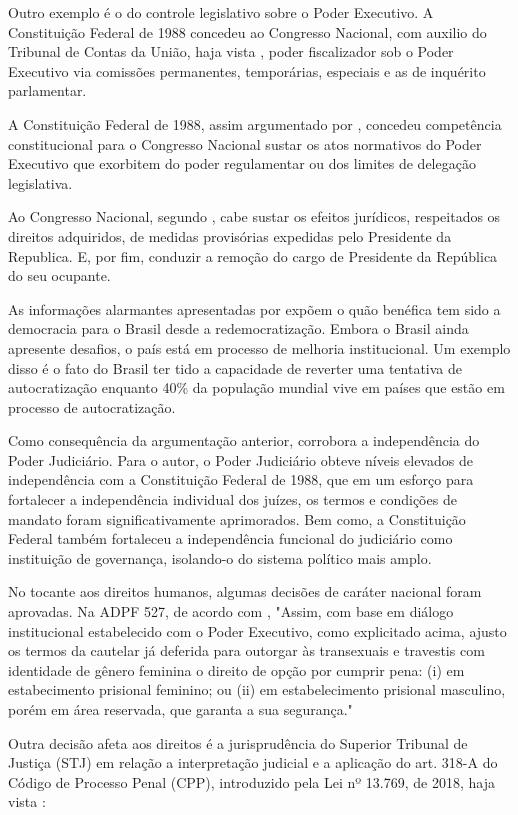Outro exemplo é o do controle legislativo sobre o Poder Executivo. A Constituição Federal de 1988 concedeu ao Congresso Nacional, com auxilio do Tribunal de Contas da União, haja vista \cite{cf88}, poder fiscalizador sob o Poder Executivo via comissões permanentes, temporárias, especiais e as de inquérito parlamentar.

A Constituição Federal de 1988, assim argumentado por \cite{cf88}, concedeu competência constitucional para o Congresso Nacional sustar os atos normativos do Poder Executivo que exorbitem do poder regulamentar ou dos limites de delegação legislativa.

Ao Congresso Nacional, segundo \cite{cf88}, cabe sustar os efeitos jurídicos, respeitados os direitos adquiridos, de medidas provisórias expedidas pelo Presidente da Republica. E, por fim, conduzir a remoção do cargo de Presidente da República do seu ocupante.

As informações alarmantes apresentadas por \cite{nord2025democracy} expõem o quão benéfica tem sido a democracia para o Brasil desde a redemocratização. Embora o Brasil ainda apresente desafios, o país está em processo de melhoria institucional. Um exemplo disso é o fato do Brasil ter tido a capacidade de reverter uma tentativa de autocratização enquanto 40\%  da população mundial vive em países que estão em processo de autocratização.

Como consequência da argumentação anterior, \cite{pires2021paradoxo} corrobora a independência do Poder Judiciário. Para o autor, o Poder Judiciário obteve níveis elevados de independência com a Constituição Federal de 1988, que em um esforço para fortalecer a independência individual dos juízes, os termos e condições de mandato foram significativamente aprimorados.  Bem como, a Constituição Federal também fortaleceu a independência funcional do judiciário como instituição de governança, isolando-o do sistema político mais amplo.

No tocante aos direitos humanos, algumas decisões de caráter nacional foram aprovadas. Na ADPF 527, de acordo com \cite{adpf527}, "Assim, com base em diálogo institucional estabelecido com o Poder Executivo, como explicitado acima, ajusto os termos da cautelar já deferida para outorgar às transexuais e travestis com identidade de gênero feminina o direito de opção por cumprir pena: (i) em estabecimento prisional feminino; ou (ii) em estabelecimento prisional masculino, porém em área reservada, que garanta a sua segurança."

Outra decisão afeta aos direitos é a jurisprudência do Superior Tribunal de Justiça (STJ) em relação a interpretação judicial e a aplicação do art. 318-A do Código de Processo Penal (CPP), introduzido pela Lei nº 13.769, de 2018, haja vista \cite{cpp}:

